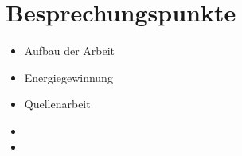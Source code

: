 \documentclass[12pt]{article}
\begin{document}
\medskip

\section{\textbf{Besprechungspunkte}}
\begin{itemize}
  \item Aufbau der Arbeit
  \item Energiegewinnung
  \item Quellenarbeit
  \item
  \item
\end{itemize}

\medskip

\printbibliography[title=Referenzen]
\end{document}
